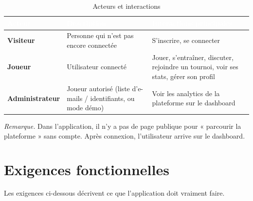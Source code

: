 \documentclass[12pt,a4paper,oneside]{article}
\begin{document}
\begin{table}[H]
\centering
\caption{Acteurs et interactions}
\begin{tabularx}{\linewidth}{|>{\bfseries}l|X|X|}
\hline
\rowcolor{sectionblue}
\textcolor{white}{Acteur} & \textcolor{white}{\textbf{Description}} & \textcolor{white}{\textbf{Interactions principales}} \\
\hline
Visiteur & Personne qui n'est pas encore connectée & S'inscrire, se connecter \\
\hline
Joueur & Utilisateur connecté & Jouer, s'entraîner, discuter, rejoindre un tournoi, voir ses stats, gérer son profil \\
\hline
Administrateur & Joueur autorisé (liste d'e-mails / identifiants, ou mode démo) & Voir les analytics de la plateforme sur le dashboard \\
\hline
\end{tabularx}
\end{table}

\noindent\textit{Remarque.} Dans l'application, il n'y a pas de page publique pour « parcourir la plateforme » sans compte.
Après connexion, l'utilisateur arrive sur le dashboard.

\section{Exigences fonctionnelles}

Les exigences ci-dessous décrivent ce que l'application doit vraiment faire.
\end{document}
